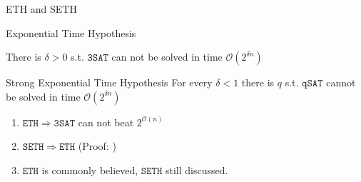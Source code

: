 \begin{frame}[c]{ETH and SETH}
    \begin{exampleblock}{Exponential Time Hypothesis}
    
    There is $\delta > 0$ s.t. $\mathtt{3SAT}$ can not be solved in time $\mathcal{O}(2^{\delta n})$ 
    
    \end{exampleblock}
    
    \pause\begin{exampleblock}{Strong Exponential Time Hypothesis}
    For every $\delta < 1$ there is $q$ s.t. $\mathtt{qSAT}$ cannot be solved in time $\mathcal{O}(2^{\delta n})$
    \end{exampleblock}
    
    
\begin{enumerate}
    \pause\item $\mathtt{ETH} \Rightarrow \mathtt{3SAT}$ can not beat $2^{\mathcal{O}(n)}$ 
    \pause\item $\mathtt{SETH} \Rightarrow \mathtt{ETH}$ (Proof: \cite[Theorem 14.5]{Cygan2015})
    \pause\item  $\mathtt{ETH}$ is commonly believed, $\mathtt{SETH}$ still discussed.
\end{enumerate}
\end{frame}

